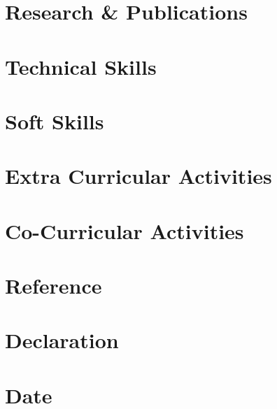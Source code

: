 \documentclass[11pt]{article}
\begin{document}
\section{Research \& Publications}
\section{Technical Skills}
\section{Soft Skills}
\section{Extra Curricular Activities}
\section{Co-Curricular Activities}
\section{Reference}
\section{Declaration}
\section{Date}
\end{document}
